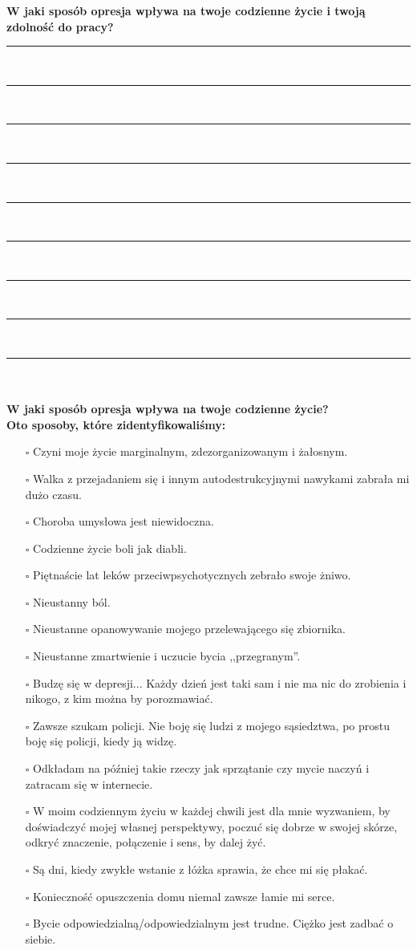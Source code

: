 \newpage
\noindent
\textcolor{ProcessBlue}{\textbf{\Large{W jaki sposób opresja wpływa na twoje codzienne życie i twoją zdolność do pracy?}}}\\
\noindent\rule{\textwidth}{1pt}\\
\noindent\rule{\textwidth}{1pt}\\
\noindent\rule{\textwidth}{1pt}\\
\noindent\rule{\textwidth}{1pt}\\
\noindent\rule{\textwidth}{1pt}\\
\noindent\rule{\textwidth}{1pt}\\
\noindent\rule{\textwidth}{1pt}\\
\noindent\rule{\textwidth}{1pt}\\
\noindent\rule{\textwidth}{1pt}\\\\

\noindent\textcolor{ProcessBlue}{\textbf{\Large{W jaki sposób opresja wpływa na twoje codzienne życie?}}}\\
\textbf{\large{Oto sposoby, które zidentyfikowaliśmy:}}
\begin{multicols}{2}
\begin{itemize}
\item[$\square$]{Czyni moje życie marginalnym, zdezorganizowanym i żałosnym.}
\item[$\square$]{Walka z przejadaniem się i innym autodestrukcyjnymi nawykami zabrała mi dużo czasu.}
\item[$\square$]{Choroba umysłowa jest niewidoczna.}
\item[$\square$]{Codzienne życie boli jak diabli.}
\item[$\square$]{Piętnaście lat leków przeciwpsychotycznych zebrało swoje żniwo.}
\item[$\square$]{Nieustanny ból.}
\item[$\square$]{Nieustanne opanowywanie mojego przelewającego się zbiornika.}
\item[$\square$]{Nieustanne zmartwienie i uczucie bycia ,,przegranym''.}
\item[$\square$]{Budzę się w depresji... Każdy dzień jest taki sam i nie ma nic do zrobienia i nikogo, z kim można by porozmawiać.}
\item[$\square$]{Zawsze szukam policji. Nie boję się ludzi z mojego sąsiedztwa, po prostu boję się policji, kiedy ją widzę.}
\item[$\square$]{Odkładam na później takie rzeczy jak sprzątanie czy mycie naczyń i zatracam się w internecie.}
\item[$\square$]{W moim codziennym życiu w każdej chwili jest dla mnie wyzwaniem, by doświadczyć mojej własnej perspektywy, poczuć się dobrze w swojej skórze, odkryć znaczenie, połączenie i sens, by dalej żyć.}
\item[$\square$]{Są dni, kiedy zwykłe wstanie z łóżka sprawia, że chce mi się płakać.}
\item[$\square$]{Konieczność opuszczenia domu niemal zawsze łamie mi serce.}
\item[$\square$]{Bycie odpowiedzialną/odpowiedzialnym jest trudne. Ciężko jest zadbać o siebie.}
\end{itemize}
\end{multicols}



